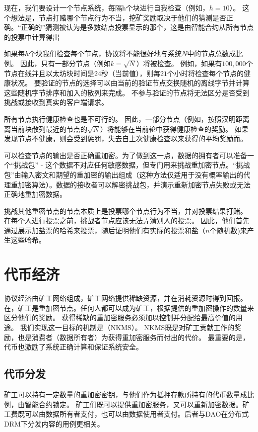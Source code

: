 \documentclass[longbibliography,nofootinbib]{revtex4-1}
\newcommand{\kms}{NuCypher KMS}
\begin{document}
\begin{CJK*}{UTF8}{gbsn}
    
    现在，我们要设计一个节点系统，每隔h个块进行自我检查（例如，$h=10$）。 这个想法是，节点打赌哪个节点行为不当，挖矿奖励取决于他们的猜测是否正确。“正确的”猜测被认为是多数结点投票显示的那个，这是由智能合约从所有节点的投票中计算得出
    
    如果每$h$个块我们检查每个节点，协议将不能很好地与系统$N$中的节点总数成比例。 因此，只有一部分节点（例如$k=\sqrt{N}$）将被检查。 例如，如果有$100,000$个节点在线并且以太坊块时间是$24$秒（当前值），则每$21$个小时将检查每个节点的健康状况。 要验证的节点的选择可以由当前的验证节点交换随机的离线字节并计算这些随机字节排序和加入的散列来完成。 不参与验证的节点将无法区分是否受到挑战或接收到真实的客户端请求。

    所有节点执行健康检查也是不可行的。 因此，一部分节点（例如，按照汉明距离离当前块散列最近的节点的$\sqrt{N}$）将能够在当前轮中获得健康检查的奖励。 如果发现节点不健康，则会受到惩罚，失去自上次健康检查以来获得的平均奖励而。

    可以检查节点的输出是否正确重加密。为了做到这一点，数据的拥有者可以准备一个“挑战包” - 这个数据不对应任何敏感数据，但专门用来挑战重加密节点。“挑战包”由输入密文和期望的重加密的输出组成（这种方法仅适用于没有概率输出的代理重加密算法）。数据的接收者可以解密挑战包，并演示重新加密节点失败或无法正确地重加密数据。

    挑战其他重密节点的节点本质上是投票哪个节点行为不当，并对投票结果打赌。 在每个人进行投票之前，挑战者节点应该无法弄清别人的投票。 因此，他们首先通过展示加盐票的哈希来投票，随后证明他们有实际的投票和盐（$n$个随机数)来产生这些哈希。

\section{代币经济}
\label{sec:token}

协议经济由矿工网络组成，矿工网络提供稀缺资源，并在消耗资源时得到回报。 在，矿工是重加密节点。任何人都可以成为矿工，根据提供的重加密操作的数量来区分他们的奖励。 获得稀缺的重加密服务必须加以控制并分配给最高价值的用途。 我们实现这一目标的机制是（NKMS）。 NKMS既是对矿工贡献工作的奖励，也是消费者（数据所有者）为获得重加密服务而付出的代价。 最重要的是，代币也激励了系统正确计算和保证系统安全。

\subsection{代币分发}

	矿工可以持有一定数量的重加密密钥，与他们作为抵押存款所持有的代币数量成比例，由智能合约锁定。 矿工们既可以提供重加密服务，又可以重新加密数据。矿工费既可以由数据所有者支付，也可以由数据使用者支付。后者与DAO在分布式DRM下分发内容的用例更相关。
    

\end{CJK*}
\end{document}
